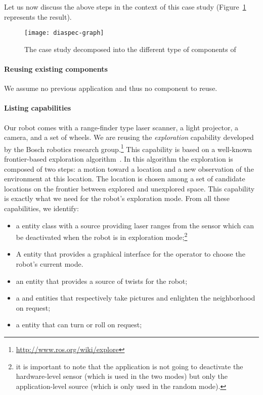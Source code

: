 Let us now discuss the above steps in the context of this case
study (Figure~\ref{fig:diaspec-graph} represents the result).

\begin{figure}
  \centering
  \texttt{[image: diaspec-graph]}
  \caption{The case study decomposed into the different type of
    components of \diaspec{}}
\label{fig:diaspec-graph}
\end{figure}

\paragraph*{Reusing existing components}
We assume no previous \diaspec{} application and thus no \diaspec{}
component to reuse.

\paragraph*{Listing capabilities}
Our robot comes with a range-finder type laser scanner, a light
projector, a camera, and a set of wheels. We are reusing the
\emph{exploration} capability developed by the Bosch robotics research
group.\footnote{\url{http://www.ros.org/wiki/explore}} This capability
is based on a well-known frontier-based exploration
algorithm~\cite{Yamau98a}. In this algorithm the exploration is
composed of two steps: a motion toward a location and a new
observation of the environment at this location. The location is
chosen among a set of candidate locations on the frontier between
explored and unexplored space. This capability is exactly what we need
for the robot's exploration mode. From all these capabilities, we
identify:
\begin{itemize}
\item a  entity class with a  source
  providing laser ranges from the sensor which can be deactivated when
  the robot is in exploration mode;\footnote{it is important to note
    that the application is not going to deactivate the hardware-level
    sensor (which is used in the two modes) but only the
    application-level source (which is only used in the random mode).}
\item A  entity that provides a graphical interface
  for the operator to choose the robot's current mode.
\item an  entity that provides a source of twists for
  the robot;
\item a  and  entities that respectively take
  pictures and enlighten the neighborhood on request;
\item a  entity that can turn or roll on request;
\end{itemize}

